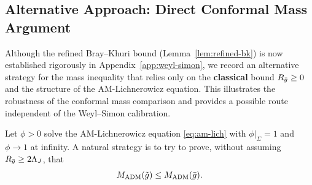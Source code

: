 \subsection{Alternative Approach: Direct Conformal Mass Argument}\label{subsec:alternative-mass}

Although the refined Bray--Khuri bound (Lemma~\ref{lem:refined-bk}) is now established rigorously in Appendix~\ref{app:weyl-simon}, we record an alternative strategy for the mass inequality that relies only on the \textbf{classical} bound $R_{\bar{g}} \geq 0$ and the structure of the AM-Lichnerowicz equation. This illustrates the robustness of the conformal mass comparison and provides a possible route independent of the Weyl--Simon calibration.

\begin{proposition}\label{prop:alternative-mass}
Let $\phi > 0$ solve the AM-Lichnerowicz equation \eqref{eq:am-lich} with $\phi|_\Sigma = 1$ and $\phi \to 1$ at infinity. A natural strategy is to try to prove, without assuming $R_{\bar{g}} \geq 2\Lambda_J$, that
\[
M_{\mathrm{ADM}}(\tilde{g}) \leq M_{\mathrm{ADM}}(\bar{g}).
\]
\end{proposition}


